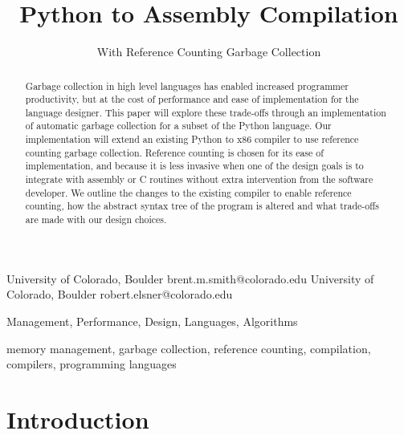 \documentclass{sigplanconf}
\begin{document}
\copyrightdata{[to be supplied]} 


\title{Python to Assembly Compilation}
\subtitle{With Reference Counting Garbage Collection}

           {University of Colorado, Boulder}
           {brent.m.smith@colorado.edu}
           {University of Colorado, Boulder}
           {robert.elsner@colorado.edu}

\maketitle

\begin{abstract}
Garbage collection in high level languages has enabled increased programmer productivity, but at the cost of performance and ease of implementation for the language designer.  This paper will explore these trade-offs through an implementation of automatic garbage collection for a subset of the Python language.   Our implementation will extend an existing Python to x86 compiler to use reference counting garbage collection.  Reference counting is chosen for its ease of implementation, and because it is less invasive when one of the design goals is to integrate with assembly or C routines without extra intervention from the software developer.  We outline the changes to the existing compiler to enable reference counting, how the abstract syntax tree of the program is altered and what trade-offs are made with our design choices.
\end{abstract}


\terms
Management, Performance, Design, Languages, Algorithms

\keywords
memory management, garbage collection, reference counting, compilation, compilers, programming languages

\section{Introduction}
\end{document}
